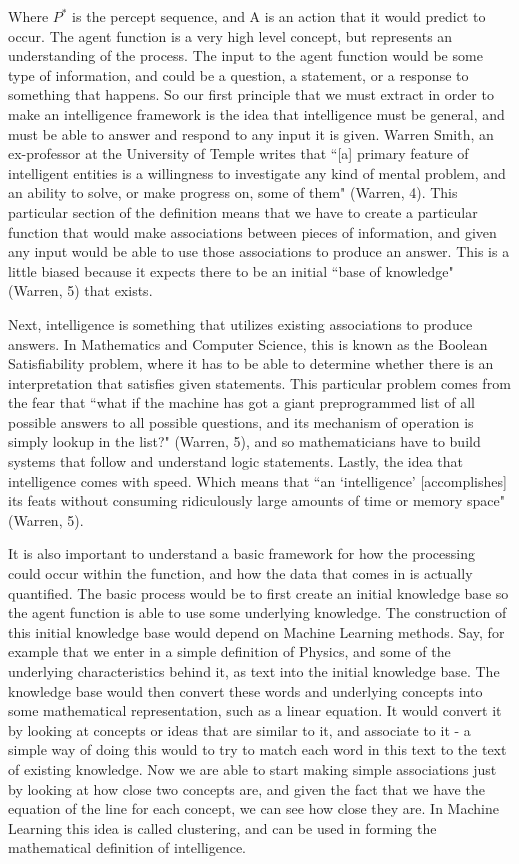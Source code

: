 \documentclass[11pt, oneside]{article}
\begin{document}
\noindent Where $P^*$ is the percept sequence, and A is an action that it would predict to occur. The agent function is a very high level concept, but represents an understanding of the process. The input to the agent function would be some type of information, and could be a question, a statement, or a response to something that happens. So our first principle that we must extract in order to make an intelligence framework is the idea that intelligence must be general, and must be able to answer and respond to any input it is given. Warren Smith, an ex-professor at the University of Temple writes that ``[a] primary feature of intelligent entities is a willingness to investigate any kind of mental problem, and an ability to solve, or make progress on, some of them" (Warren, 4). This particular section of the definition means that we have to create a particular function that would make associations between pieces of information, and given any input would be able to use those associations to produce an answer. This is a little biased because it expects there to be an initial ``base of knowledge" (Warren, 5) that exists. 

\par Next, intelligence is something that utilizes existing associations to produce answers. In Mathematics and Computer Science, this is known as the Boolean Satisfiability problem, where it has to be able to determine whether there is an interpretation that satisfies given statements. This particular problem comes from the fear that ``what if the machine has got a giant preprogrammed list of all possible answers to all possible questions, and its mechanism of operation is simply lookup in the list?" (Warren, 5), and so mathematicians have to build systems that follow and understand logic statements. Lastly, the idea that intelligence comes with speed. Which means that ``an `intelligence' [accomplishes] its feats without consuming ridiculously large amounts of time or memory space" (Warren, 5). 

\par It is also important to understand a basic framework for how the processing could occur within the function, and how the data that comes in is actually quantified. The basic process would be to first create an initial knowledge base so the agent function is able to use some underlying knowledge. The construction of this initial knowledge base would depend on Machine Learning methods. Say, for example that we enter in a simple definition of Physics, and some of the underlying characteristics behind it, as text into the initial knowledge base. The knowledge base would then convert these words and underlying concepts into some mathematical representation, such as a linear equation. It would convert it by looking at concepts or ideas that are similar to it, and associate to it - a simple way of doing this would to try to match each word in this text to the text of existing knowledge. Now we are able to start making simple associations just by looking at how close two concepts are, and given the fact that we have the equation of the line for each concept, we can see how close they are. In Machine Learning this idea is called clustering, and can be used in forming the mathematical definition of intelligence. 
\end{document}
